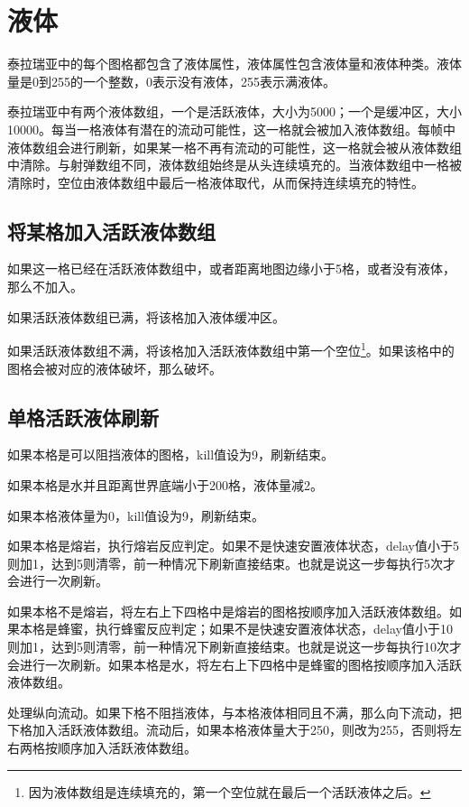 \chapter{液体}\label{app23}

泰拉瑞亚中的每个图格都包含了液体属性，液体属性包含液体量和液体种类。液体量是0到255的一个整数，0表示没有液体，255表示满液体。

泰拉瑞亚中有两个液体数组，一个是活跃液体，大小为5000；一个是缓冲区，大小10000。每当一格液体有潜在的流动可能性，这一格就会被加入液体数组。每帧中液体数组会进行刷新，如果某一格不再有流动的可能性，这一格就会被从液体数组中清除。与射弹数组不同，液体数组始终是从头连续填充的。当液体数组中一格被清除时，空位由液体数组中最后一格液体取代，从而保持连续填充的特性。

\section{将某格加入活跃液体数组}
如果这一格已经在活跃液体数组中，或者距离地图边缘小于5格，或者没有液体，那么不加入。

如果活跃液体数组已满，将该格加入液体缓冲区。

如果活跃液体数组不满，将该格加入活跃液体数组中第一个空位\footnote{因为液体数组是连续填充的，第一个空位就在最后一个活跃液体之后。}。如果该格中的图格会被对应的液体破坏，那么破坏。

\section{单格活跃液体刷新}
如果本格是可以阻挡液体的图格，kill值设为9，刷新结束。

如果本格是水并且距离世界底端小于200格，液体量减2。

如果本格液体量为0，kill值设为9，刷新结束。

如果本格是熔岩，执行熔岩反应判定。如果不是快速安置液体状态，delay值小于5则加1，达到5则清零，前一种情况下刷新直接结束。也就是说这一步每执行5次才会进行一次刷新。

如果本格不是熔岩，将左右上下四格中是熔岩的图格按顺序加入活跃液体数组。如果本格是蜂蜜，执行蜂蜜反应判定；如果不是快速安置液体状态，delay值小于10则加1，达到5则清零，前一种情况下刷新直接结束。也就是说这一步每执行10次才会进行一次刷新。如果本格是水，将左右上下四格中是蜂蜜的图格按顺序加入活跃液体数组。

处理纵向流动。如果下格不阻挡液体，与本格液体相同且不满，那么向下流动，把下格加入活跃液体数组。流动后，如果本格液体量大于250，则改为255，否则将左右两格按顺序加入活跃液体数组。

